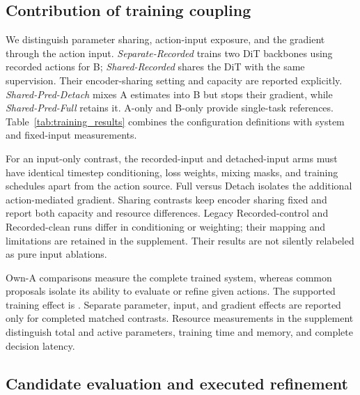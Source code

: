 \subsection{Contribution of training coupling}
\label{sec:training_results}
We distinguish parameter sharing, action-input exposure, and the gradient through the action input. \emph{Separate-Recorded} trains two DiT backbones using recorded actions for B; \emph{Shared-Recorded} shares the DiT with the same supervision. Their encoder-sharing setting and capacity are reported explicitly. \emph{Shared-Pred-Detach} mixes A estimates into B but stops their gradient, while \emph{Shared-Pred-Full} retains it. A-only and B-only provide single-task references. Table~\ref{tab:training_results} combines the configuration definitions with system and fixed-input measurements.
\begin{table}[t]
\centering\scriptsize
\resizebox{\textwidth}{!}{}
\caption{Coupling ablation template, instantiated per task and training seed. Own-A measures each configuration's actor; common-pool regret and executed refinement use fixed physical actions to compare dynamics models. Dashes are inapplicable entries. Pending conditional controls are not completed experiments.}
\label{tab:training_results}
\end{table}
For an input-only contrast, the recorded-input and detached-input arms must have identical timestep conditioning, loss weights, mixing masks, and training schedules apart from the action source. Full versus Detach isolates the additional action-mediated gradient. Sharing contrasts keep encoder sharing fixed and report both capacity and resource differences. Legacy Recorded-control and Recorded-clean runs differ in conditioning or weighting; their mapping and limitations are retained in the supplement. Their results are not silently relabeled as pure input ablations.

Own-A comparisons measure the complete trained system, whereas common proposals isolate its ability to evaluate or refine given actions. The supported training effect is . Separate parameter, input, and gradient effects are reported only for completed matched contrasts. Resource measurements in the supplement distinguish total and active parameters, training time and memory, and complete decision latency.

\subsection{Candidate evaluation and executed refinement}
\label{sec:ranking}
